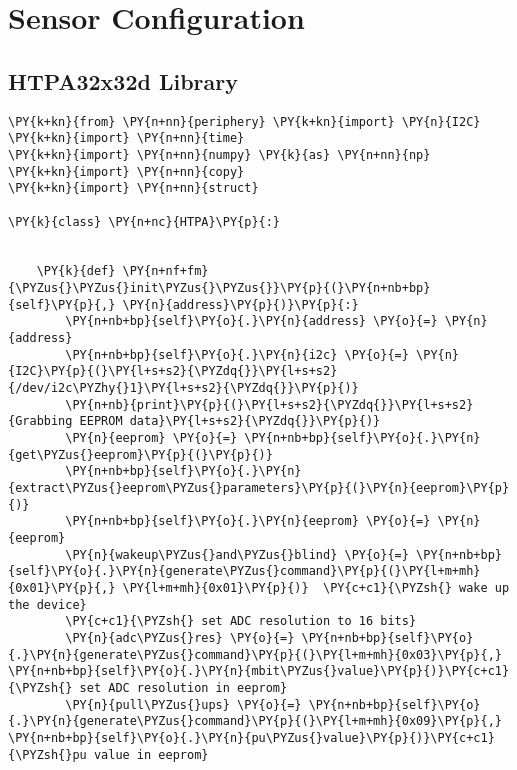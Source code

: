 

    
\section{\textbf{Sensor Configuration}}

    \subsection{HTPA32x32d Library \cite{perip} }

    \begin{tcolorbox}[breakable, size=fbox, boxrule=1pt, pad at break*=1mm,colback=cellbackground, colframe=cellborder]
\begin{Verbatim}[commandchars=\\\{\}]
\PY{k+kn}{from} \PY{n+nn}{periphery} \PY{k+kn}{import} \PY{n}{I2C}
\PY{k+kn}{import} \PY{n+nn}{time}
\PY{k+kn}{import} \PY{n+nn}{numpy} \PY{k}{as} \PY{n+nn}{np}
\PY{k+kn}{import} \PY{n+nn}{copy}
\PY{k+kn}{import} \PY{n+nn}{struct}

\PY{k}{class} \PY{n+nc}{HTPA}\PY{p}{:}


	\PY{k}{def} \PY{n+nf+fm}{\PYZus{}\PYZus{}init\PYZus{}\PYZus{}}\PY{p}{(}\PY{n+nb+bp}{self}\PY{p}{,} \PY{n}{address}\PY{p}{)}\PY{p}{:}
		\PY{n+nb+bp}{self}\PY{o}{.}\PY{n}{address} \PY{o}{=} \PY{n}{address}
		\PY{n+nb+bp}{self}\PY{o}{.}\PY{n}{i2c} \PY{o}{=} \PY{n}{I2C}\PY{p}{(}\PY{l+s+s2}{\PYZdq{}}\PY{l+s+s2}{/dev/i2c\PYZhy{}1}\PY{l+s+s2}{\PYZdq{}}\PY{p}{)}
		\PY{n+nb}{print}\PY{p}{(}\PY{l+s+s2}{\PYZdq{}}\PY{l+s+s2}{Grabbing EEPROM data}\PY{l+s+s2}{\PYZdq{}}\PY{p}{)}
		\PY{n}{eeprom} \PY{o}{=} \PY{n+nb+bp}{self}\PY{o}{.}\PY{n}{get\PYZus{}eeprom}\PY{p}{(}\PY{p}{)}
		\PY{n+nb+bp}{self}\PY{o}{.}\PY{n}{extract\PYZus{}eeprom\PYZus{}parameters}\PY{p}{(}\PY{n}{eeprom}\PY{p}{)}
		\PY{n+nb+bp}{self}\PY{o}{.}\PY{n}{eeprom} \PY{o}{=} \PY{n}{eeprom}
		\PY{n}{wakeup\PYZus{}and\PYZus{}blind} \PY{o}{=} \PY{n+nb+bp}{self}\PY{o}{.}\PY{n}{generate\PYZus{}command}\PY{p}{(}\PY{l+m+mh}{0x01}\PY{p}{,} \PY{l+m+mh}{0x01}\PY{p}{)}  \PY{c+c1}{\PYZsh{} wake up the device}
		\PY{c+c1}{\PYZsh{} set ADC resolution to 16 bits}
		\PY{n}{adc\PYZus{}res} \PY{o}{=} \PY{n+nb+bp}{self}\PY{o}{.}\PY{n}{generate\PYZus{}command}\PY{p}{(}\PY{l+m+mh}{0x03}\PY{p}{,} \PY{n+nb+bp}{self}\PY{o}{.}\PY{n}{mbit\PYZus{}value}\PY{p}{)}\PY{c+c1}{\PYZsh{} set ADC resolution in eeprom}
		\PY{n}{pull\PYZus{}ups} \PY{o}{=} \PY{n+nb+bp}{self}\PY{o}{.}\PY{n}{generate\PYZus{}command}\PY{p}{(}\PY{l+m+mh}{0x09}\PY{p}{,} \PY{n+nb+bp}{self}\PY{o}{.}\PY{n}{pu\PYZus{}value}\PY{p}{)}\PY{c+c1}{\PYZsh{}pu value in eeprom}


\end{Verbatim}
\end{tcolorbox}
